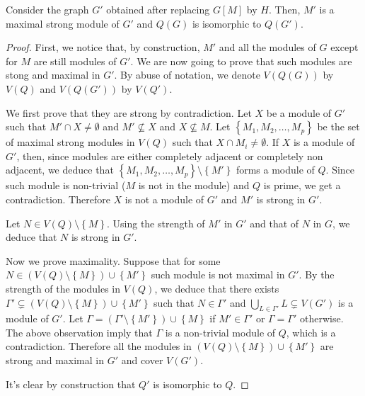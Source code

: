 \documentclass{article}
\begin{document}
    \begin{lemma} \label{for thm}
        Consider the graph $G'$
        obtained after replacing
        $G\left[M\right]$ by $H$.
        Then, $M'$ is a maximal
        strong module of $G'$ 
        and $Q\left(G\right)$
        is isomorphic to
        $Q\left(G'\right)$.
    \end{lemma}
    \begin{proof}
    First, we notice that, by construction,
    $M'$ and all the modules of $G$
    except for $M$ are still modules of $G'$.
    We are now going to prove that such modules
    are stong and maximal in $G'$.
    By abuse of notation,
    we denote $V\left(Q\left(G\right)\right)$ 
    by $V\left(Q\right)$
    and $V\left(Q\left(G'\right)\right)$ 
    by $V\left(Q'\right)$.

    We first prove that they are strong by contradiction.
    Let $X$ be a module of $G'$ such that $M' \cap X \neq \emptyset$
    and $M' \not \subseteq X$ and $X \not \subseteq M$.
    Let $\left\{M_1, M_2, \ldots, M_{p}\right\}$ be the set of maximal strong modules
    in $V\left(Q\right)$ such 
    that $X \cap M_{i} \neq \emptyset$.
    If $X$ is a module of $G'$, then, since modules are either completely
    adjacent or completely non adjacent, we deduce that $\left\{M_1, M_2, \ldots, M_{p}\right\}
    \setminus \left\{M'\right\}$
    forms a module of $Q$. Since such module is non-trivial ($M$ is
    not in the module)
    and $Q$ is prime, we get a contradiction.
    Therefore $X$ is not a module of $G'$ and $M'$ is strong in $G'$.

    Let $N \in V\left(Q\right) \setminus \left\{M\right\}$.
    Using the strength of $M'$ in $G'$ and that of $N$ in $G$, 
    we deduce that $N$ is strong in $G'$.
    
    Now we prove maximality. Suppose that for some $N \in \left(V\left(Q\right)
        \setminus \left\{M\right\} \right) \cup \left\{M'\right\}$
    such module is not maximal in $G'$. By the strength of the modules
    in $V\left(Q\right)$, we deduce that there exists
    $\Gamma' \subsetneq \left(V\left(Q\right) \setminus \left\{M\right\}\right) 
    \cup \left\{M'\right\}$ such that $N \in \Gamma'$ and
    $\bigcup_{L \in \Gamma'} L \subsetneq V\left(G'\right)$ is a module of $G'$.
    Let $\Gamma = \left(\Gamma' \setminus \left\{M'\right\}\right) \cup \left\{M\right\}$ 
    if $M' \in \Gamma'$ or $\Gamma = \Gamma'$ otherwise.
    The above observation imply that $\Gamma$ is a non-trivial module of $Q$, which is a contradiction.
    Therefore all the modules in $\left(V\left(Q\right) \setminus \left\{M\right\}\right)
    \cup \left\{M'\right\}$ are strong and maximal
    in $G'$ and cover $V\left(G'\right)$.
    
    It's clear by construction that $Q'$ 
    is isomorphic to $Q$.
    \end{proof}
    
\end{document}
